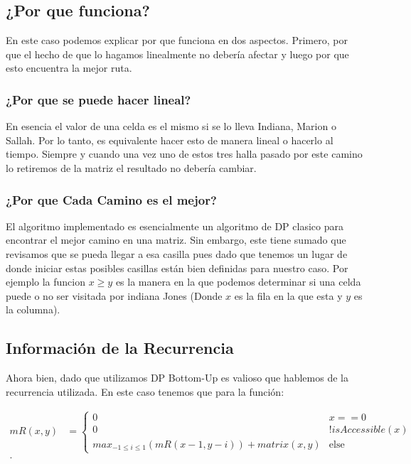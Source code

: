 \documentclass[12pt]{exam}
\begin{document}
\subsection{¿Por que funciona?}

En este caso podemos explicar por que funciona en dos aspectos. Primero, por que el hecho de que lo hagamos linealmente no debería afectar y luego por que esto encuentra la mejor ruta.

\subsubsection{¿Por que se puede hacer lineal?}

En esencia el valor de una celda es el mismo si se lo lleva Indiana, Marion o Sallah. Por lo tanto, es equivalente hacer esto de manera lineal o hacerlo al tiempo. Siempre y cuando una vez uno de estos tres halla pasado por este camino lo retiremos de la matriz el resultado no debería cambiar.

\subsubsection{¿Por que Cada Camino es el mejor?}

El algoritmo implementado es esencialmente un algoritmo de DP clasico para encontrar el mejor camino en una matriz. Sin embargo, este tiene sumado que revisamos que se pueda llegar a esa casilla pues dado que tenemos un lugar de donde iniciar estas posibles casillas están bien definidas para nuestro caso. Por ejemplo la funcion $x \ge y$ es la manera en la que podemos determinar si una celda puede o no ser visitada por indiana Jones (Donde $x$ es la fila en la que esta y $y$ es la columna).

\subsection{Información de la Recurrencia}

Ahora bien, dado que utilizamos DP Bottom-Up es valioso que hablemos de la recurrencia utilizada. En este caso tenemos que para la función:

\begin{align*}
  mR\left( x, y \right) &= \begin{cases}
    0 & x == 0\\
    0 & !isAccessible(x)\\
    max_{-1 \le i \le 1}\left( mR\left( x - 1, y - i \right)  \right) + matrix(x, y) & \text{else}
  \end{cases} \\
.\end{align*}
\end{document}
